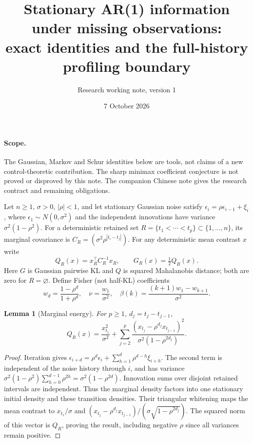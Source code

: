 \documentclass[11pt]{article}
\title{Stationary AR(1) information under missing observations:\\ exact identities and the full-history profiling boundary}
\author{Research working note, version 1}
\date{7 October 2026}
\newtheorem{lemma}{Lemma}
\newcommand{\sig}{\sigma}
\begin{document}
\maketitle

\paragraph{Scope.}
The Gaussian, Markov and Schur identities below are tools, not claims of a
new control-theoretic contribution. The sharp minimax coefficient conjecture
is not proved or disproved by this note. The companion Chinese note gives
the research contract and remaining obligations.

Let $n\ge1$, $\sig>0$, $|\rho|<1$, and let stationary Gaussian noise satisfy
$\epsilon_i=\rho\epsilon_{i-1}+\xi_i$, where
$\epsilon_1\sim N(0,\sig^2)$ and the independent innovations have variance
$\sig^2(1-\rho^2)$. For a deterministic retained set
$R=\{t_1<\cdots<t_p\}\subset\{1,\ldots,n\}$, its marginal covariance is
$C_R=(\sig^2\rho^{|t_i-t_j|})$. For any deterministic mean contrast $x$ write
\begin{equation}\label{eq:contract}
 Q_R(x)=x_R^\top C_R^{-1}x_R,\qquad G_R(x)=\tfrac12Q_R(x).
\end{equation}
Here $G$ is Gaussian pairwise KL and $Q$ is squared Mahalanobis distance;
both are zero for $R=\varnothing$. Define Fisher (not half-KL) coefficients
\begin{equation}\label{eq:coefficients}
 w_d=\frac{1-\rho^d}{1+\rho^d},\quad
 \nu=\frac{w_1}{\sig^2},\quad
 \beta(k)=\frac{(k+1)w_1-w_{k+1}}{\sig^2}.
\end{equation}

\begin{lemma}[Marginal energy]\label{lem:marginal}
For $p\ge1$, $d_j=t_j-t_{j-1}$,
\begin{equation}\label{eq:marginal}
 Q_R(x)=\frac{x_{t_1}^2}{\sig^2}
 +\sum_{j=2}^p\frac{(x_{t_j}-\rho^{d_j}x_{t_{j-1}})^2}
 {\sig^2(1-\rho^{2d_j})}.
\end{equation}
\end{lemma}
\begin{proof}
Iteration gives
$\epsilon_{i+d}=\rho^d\epsilon_i+\sum_{h=1}^d\rho^{d-h}\xi_{i+h}$.
The second term is independent of the noise history through $i$, and has
variance $\sig^2(1-\rho^2)\sum_{h=0}^{d-1}\rho^{2h}
=\sig^2(1-\rho^{2d})$. Innovation sums over disjoint retained intervals are
independent. Thus the marginal density factors into one stationary initial
density and these transition densities. Their triangular whitening maps the
mean contrast to $x_{t_1}/\sig$ and
$(x_{t_j}-\rho^{d_j}x_{t_{j-1}})/(\sig\sqrt{1-\rho^{2d_j}})$.
The squared norm of this vector is $Q_R$, proving the result, including
negative $\rho$ since all variances remain positive.
\end{proof}
\end{document}
